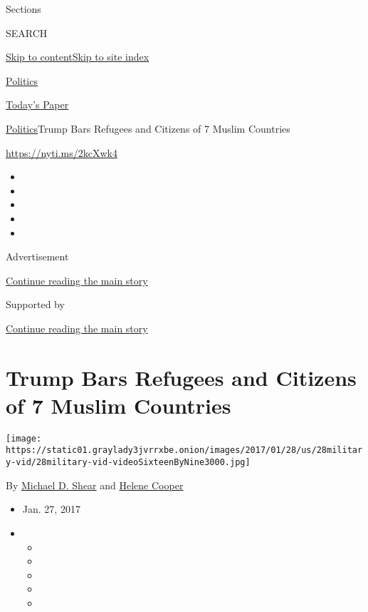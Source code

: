 Sections

SEARCH

\protect\hyperlink{site-content}{Skip to
content}\protect\hyperlink{site-index}{Skip to site index}

\href{https://www.nytimes3xbfgragh.onion/section/politics}{Politics}

\href{https://myaccount.nytimes3xbfgragh.onion/auth/login?response_type=cookie\&client_id=vi}{}

\href{https://www.nytimes3xbfgragh.onion/section/todayspaper}{Today's
Paper}

\href{/section/politics}{Politics}\textbar{}Trump Bars Refugees and
Citizens of 7 Muslim Countries

\url{https://nyti.ms/2kcXwk4}

\begin{itemize}
\item
\item
\item
\item
\item
\end{itemize}

Advertisement

\protect\hyperlink{after-top}{Continue reading the main story}

Supported by

\protect\hyperlink{after-sponsor}{Continue reading the main story}

\hypertarget{trump-bars-refugees-and-citizens-of-7-muslim-countries}{%
\section{Trump Bars Refugees and Citizens of 7 Muslim
Countries}\label{trump-bars-refugees-and-citizens-of-7-muslim-countries}}

\texttt{[image: https://static01.graylady3jvrrxbe.onion/images/2017/01/28/us/28military-vid/28military-vid-videoSixteenByNine3000.jpg]}

By \href{http://www.nytimes3xbfgragh.onion/by/michael-d-shear}{Michael
D. Shear} and
\href{http://www.nytimes3xbfgragh.onion/by/helene-cooper}{Helene Cooper}

\begin{itemize}
\item
  Jan. 27, 2017
\item
  \begin{itemize}
  \item
  \item
  \item
  \item
  \item
  \end{itemize}
\end{itemize}

